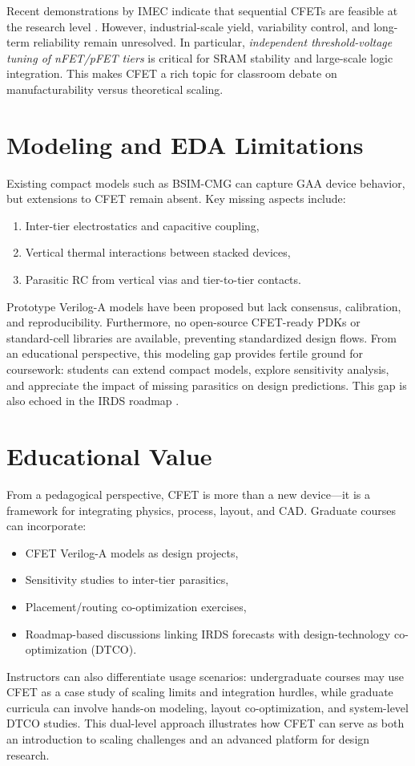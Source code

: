 \documentclass[conference]{IEEEtran}
\begin{document}
Recent demonstrations by IMEC indicate that sequential CFETs are feasible at the research level \cite{imec_cfet_iedm2020}.
However, industrial-scale yield, variability control, and long-term reliability remain unresolved.
In particular, \emph{independent threshold-voltage tuning of nFET/pFET tiers} is critical for SRAM stability and large-scale logic integration.
This makes CFET a rich topic for classroom debate on manufacturability versus theoretical scaling.

\section{Modeling and EDA Limitations}
Existing compact models such as BSIM-CMG can capture GAA device behavior, but extensions to CFET remain absent.
Key missing aspects include:
\begin{enumerate}
  \item Inter-tier electrostatics and capacitive coupling,
  \item Vertical thermal interactions between stacked devices,
  \item Parasitic RC from vertical vias and tier-to-tier contacts.
\end{enumerate}
Prototype Verilog-A models have been proposed but lack consensus, calibration, and reproducibility.
Furthermore, no open-source CFET-ready PDKs or standard-cell libraries are available, preventing standardized design flows.
From an educational perspective, this modeling gap provides fertile ground for coursework:
students can extend compact models, explore sensitivity analysis, and appreciate the impact of missing parasitics on design predictions.
This gap is also echoed in the IRDS roadmap \cite{irds_2023}.

\section{Educational Value}
From a pedagogical perspective, CFET is more than a new device—it is a framework for integrating physics, process, layout, and CAD.
Graduate courses can incorporate:
\begin{itemize}
  \item CFET Verilog-A models as design projects,
  \item Sensitivity studies to inter-tier parasitics,
  \item Placement/routing co-optimization exercises,
  \item Roadmap-based discussions linking IRDS forecasts with design-technology co-optimization (DTCO).
\end{itemize}
Instructors can also differentiate usage scenarios:
undergraduate courses may use CFET as a case study of scaling limits and integration hurdles,
while graduate curricula can involve hands-on modeling, layout co-optimization, and system-level DTCO studies.
This dual-level approach illustrates how CFET can serve as both an introduction to scaling challenges and an advanced platform for design research.
\end{document}
